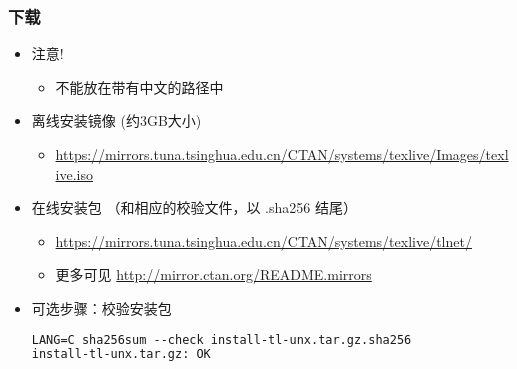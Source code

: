 \begin{frame}[fragile]
  \frametitle{下载}
  \begin{itemize}
    \item 注意!
      \begin{itemize}
        \item 不能放在带有中文的路径中
      \end{itemize}
    \item 离线安装镜像 (约3GB大小)
      \begin{itemize}
        \item {\footnotesize
          \url{https://mirrors.tuna.tsinghua.edu.cn/CTAN/systems/texlive/Images/texlive.iso}}
      \end{itemize}
    \item 在线安装包 （和相应的校验文件，以 .sha256 结尾）
      \begin{itemize} %
        \item {\footnotesize
          \url{https://mirrors.tuna.tsinghua.edu.cn/CTAN/systems/texlive/tlnet/}
        }
        \item 更多可见 \url{http://mirror.ctan.org/README.mirrors}
      \end{itemize}

    \item 可选步骤：校验安装包
      \begin{lstlisting}[language=tex]
LANG=C sha256sum --check install-tl-unx.tar.gz.sha256
install-tl-unx.tar.gz: OK
      \end{lstlisting}

  \end{itemize}
\end{frame}

